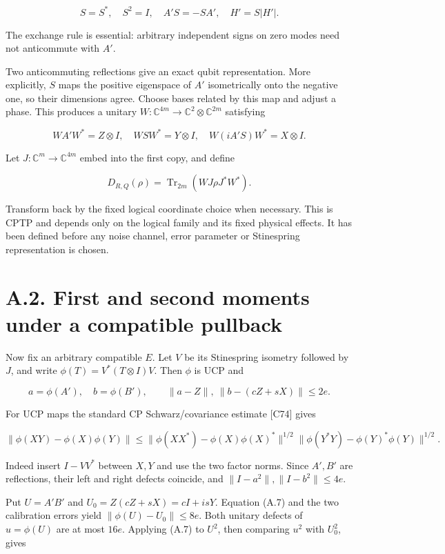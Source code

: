\documentclass[11pt]{article}
\begin{document}
\[
S=S^*,\quad S^2=I,\quad A'S=-SA',\quad H'=S|H'|.
\tag{A.3}
\]

The exchange rule is essential: arbitrary independent signs on zero modes
need not anticommute with \(A'\).

Two anticommuting reflections give an exact qubit representation. More
explicitly, \(S\) maps the positive eigenspace of \(A'\) isometrically
onto the negative one, so their dimensions agree. Choose bases related by
this map and adjust a phase. This produces a unitary
\(W:\mathbb C^{4m}\to\mathbb C^2\otimes\mathbb C^{2m}\) satisfying

\[
WA'W^*=Z\otimes I,\quad WSW^*=Y\otimes I,\quad
W(iA'S)W^*=X\otimes I.
\tag{A.4}
\]

Let \(J:\mathbb C^m\to\mathbb C^{4m}\) embed into the first copy, and
define

\[
D_{R,Q}(\rho)=\operatorname{Tr}_{2m}(WJ\rho J^*W^*).
\tag{A.5}
\]

Transform back by the fixed logical coordinate choice when necessary. This
is CPTP and depends only on the logical family and its fixed physical effects.
It has been defined before any noise channel, error parameter or Stinespring
representation is chosen.

\section*{A.2. First and second moments under a compatible pullback}

Now fix an arbitrary compatible \(E\). Let \(V\) be its Stinespring
isometry followed by \(J\), and write \(\phi(T)=V^*(T\otimes I)V\).
Then \(\phi\) is UCP and

\[
a=\phi(A'),\quad b=\phi(B'),\qquad
\|a-Z\|,\ \|b-(cZ+sX)\|\le2e.
\tag{A.6}
\]

For UCP maps the standard CP Schwarz/covariance estimate [C74] gives

\[
\|\phi(XY)-\phi(X)\phi(Y)\|
\le\|\phi(XX^*)-\phi(X)\phi(X)^*\|^{1/2}
\|\phi(Y^*Y)-\phi(Y)^*\phi(Y)\|^{1/2}.
\tag{A.7}
\]

Indeed insert \(I-VV^*\) between \(X,Y\) and use the two factor norms.
Since \(A',B'\) are reflections, their left and right defects coincide,
and \(\|I-a^2\|,\|I-b^2\|\le4e\).

Put \(U=A'B'\) and \(U_0=Z(cZ+sX)=cI+isY\). Equation (A.7) and
the two calibration errors yield \(\|\phi(U)-U_0\|\le8e\). Both
unitary defects of \(u=\phi(U)\) are at most \(16e\). Applying (A.7)
to \(U^2\), then comparing \(u^2\) with \(U_0^2\), gives
\end{document}
